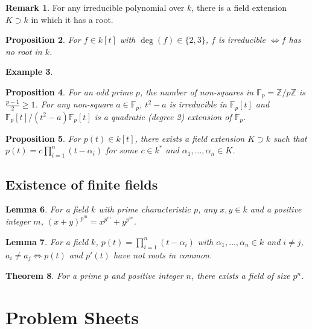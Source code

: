 \documentclass[12pt]{article}
\newtheorem{thm}{Theorem}[section]
\newtheorem{lem}[thm]{Lemma}
\newtheorem{prop}[thm]{Proposition}
\theoremstyle{definition}
\newtheorem{exm}[thm]{Example}
\newtheorem{rmk}[thm]{Remark}
\newcommand{\Z}{\mathbb{Z}}
\newcommand{\F}{\mathbb{F}}
\begin{document}
\begin{rmk}
  For any irreducible polynomial over $k$, there is a field extension $K \supset k$ in which it has a root.
\end{rmk}

\begin{prop}
  For $f \in k[t]$ with $\deg(f) \in \{2, 3\}$, $f$ is irreducible $\iff f$ has no root in $k$.
\end{prop}

\begin{exm}
\end{exm}

\begin{prop}
  For an odd prime $p$, the number of non-squares in $\F_p = \Z / p\Z$ is $\frac{p - 1}{2} \geq 1$.
  For any non-square $a \in \F_p$, $t^2 - a$ is irreducible in $\F_p[t]$ and $\F_p[t] / (t^2 - a)\F_p[t]$ is a quadratic (degree 2) extension of $\F_p$.
\end{prop}

\begin{prop}
  For $p(t) \in k[t]$, there exists a field extension $K \supset k$ such that $p(t) = c\prod_{i = 1}^n(t - \alpha_i)$ for some $c \in k^{\ast}$ and $\alpha_1, \ldots, \alpha_n \in K$.
\end{prop}

\subsection{Existence of finite fields}

\begin{lem}
  For a field $k$ with prime characteristic $p$, any $x, y \in k$ and a positive integer $m$, $(x + y)^{p^m} = x^{p^m} + y^{p^m}$.
\end{lem}

\begin{lem}
  For a field $k$, $p(t) = \prod_{i = 1}^n(t - \alpha_i)$ with $\alpha_1, \ldots, \alpha_n \in k$ and $i \neq j$, $a_i \neq a_j \iff p(t)$ and $p'(t)$ have not roots in common.
\end{lem}

\begin{thm}
  For a prime $p$ and positive integer $n$, there exists a field of size $p^n$.
\end{thm}

\appendix

\section{Problem Sheets}
\end{document}
